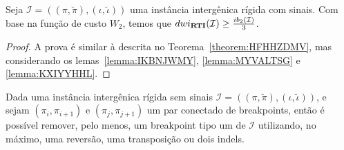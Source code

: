\begin{theorem}\label{theorem:IXYMBAWM}
Seja $\mathcal{I} = ((\pi,\breve\pi),(\iota,\breve\iota))$ uma instância intergênica rígida com sinais. Com base na função de custo $W_2$, temos que $dwi_{\textbf{RTI}}(\mathcal{I}) \ge \frac{ib_2(\mathcal{I})}{3}$.
\begin{proof}
A prova é similar à descrita no Teorema~\ref{theorem:HFHHZDMV}, mas considerando os lemas~\ref{lemma:IKBNJWMY}, \ref{lemma:MYVALTSG} e \ref{lemma:KXIYYHHL}.
\end{proof}
\end{theorem}

\begin{lemma}\label{lemma:XLFWKWTV}
Dada uma instância intergênica rígida sem sinais $\mathcal{I}=((\pi,\breve\pi),(\iota,\breve\iota))$, e sejam $(\pi_i,\pi_{i+1})$ e $(\pi_j,\pi_{j+1})$ um par conectado de breakpoints, então é possível remover, pelo menos, um breakpoint tipo um de $\mathcal{I}$ utilizando, no máximo, uma reversão, uma transposição ou dois indels.
\end{lemma}
